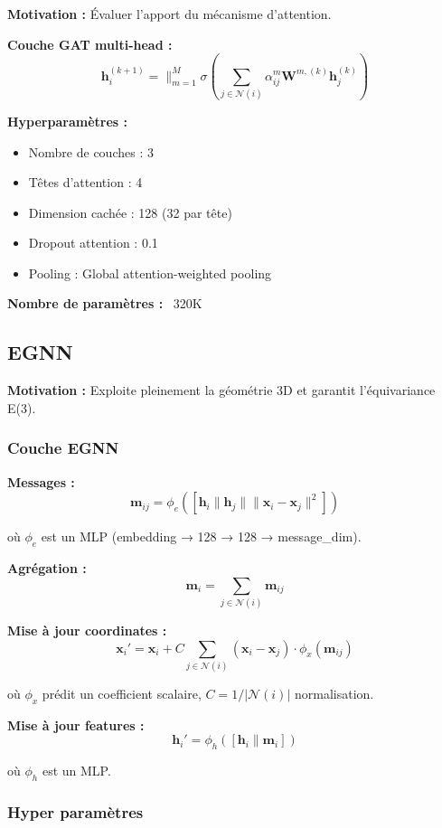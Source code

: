 \textbf{Motivation :}
Évaluer l'apport du mécanisme d'attention.

\textbf{Couche GAT multi-head :}
\[
\mathbf{h}_i^{(k+1)} = \|_{m=1}^M \sigma\left(\sum_{j \in \mathcal{N}(i)} \alpha_{ij}^m \mathbf{W}^{m,(k)}\mathbf{h}_j^{(k)}\right)
\]

\textbf{Hyperparamètres :}
\begin{itemize}
    \item Nombre de couches : 3
    \item Têtes d'attention : 4
    \item Dimension cachée : 128 (32 par tête)
    \item Dropout attention : 0.1
    \item Pooling : Global attention-weighted pooling
\end{itemize}

\textbf{Nombre de paramètres :} ~320K

\subsection{EGNN}

\textbf{Motivation :}
Exploite pleinement la géométrie 3D et garantit l'équivariance E(3).

\subsubsection{Couche EGNN}

\textbf{Messages :}
\[
\mathbf{m}_{ij} = \phi_e\left([\mathbf{h}_i \| \mathbf{h}_j \| \|\mathbf{x}_i - \mathbf{x}_j\|^2]\right)
\]

où $\phi_e$ est un MLP (embedding → 128 → 128 → message\_dim).

\textbf{Agrégation :}
\[
\mathbf{m}_i = \sum_{j \in \mathcal{N}(i)} \mathbf{m}_{ij}
\]

\textbf{Mise à jour coordinates :}
\[
\mathbf{x}_i' = \mathbf{x}_i + C \sum_{j \in \mathcal{N}(i)} (\mathbf{x}_i - \mathbf{x}_j) \cdot \phi_x(\mathbf{m}_{ij})
\]

où $\phi_x$ prédit un coefficient scalaire, $C = 1/|\mathcal{N}(i)|$ normalisation.

\textbf{Mise à jour features :}
\[
\mathbf{h}_i' = \phi_h([\mathbf{h}_i \| \mathbf{m}_i])
\]

où $\phi_h$ est un MLP.

\subsubsection{Hyper paramètres}

